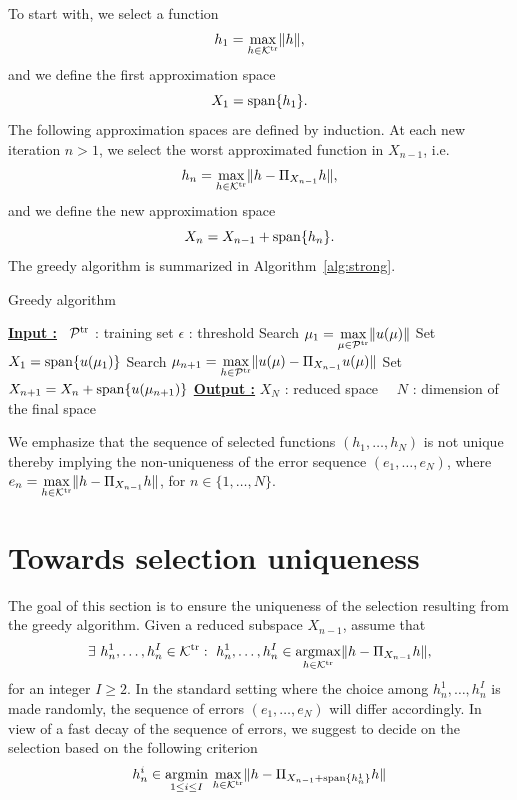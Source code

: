 \documentclass[12pt,a4paper]{article}
\newcommand{\Ptr}{\mathcal P^{\rm tr}}
\newcommand{\calK}{\mathcal K}
\newcommand{\Ktr}{\calK^{\rm tr}}
\begin{document}
To start with, we select a function 
\begin{equation}
h_1 = \underset{h\in\Ktr}{\rm max}\|h\|,
\end{equation}
and we define the first approximation space
\begin{equation}
X_1 = {\rm span}\{h_1\}.
\end{equation}
The following approximation spaces are defined by induction. 
At each new iteration $n>1$, we select the worst approximated function in $X_{n-1}$, i.e.
\begin{equation}
h_n = \underset{h\in\Ktr}{\rm max}\|h-\Pi_{X_{n-1}}h\|,
\end{equation}
and we define the new approximation space
\begin{equation}
X_n = X_{n-1} + {\rm span}\{h_n\}.
\end{equation}
The greedy algorithm is summarized in Algorithm~\ref{alg:strong}.

\begin{algorithm}[H]
\caption{Greedy algorithm}\label{alg:strong}
\begin{algorithmic}[1]
\Statex \textbf{\underline{Input :}}
\ $\Ptr$ : training set
\Statex\qquad\qquad $\epsilon$ : threshold
\State Search $\mu_1 = \underset{\mu\in\Ptr}{\rm max}\|u(\mu)\|$
\State Set $X_1 = {\rm span}\{u(\mu_1)\}$
\While{ $>\epsilon$}
\State Search $\mu_{n+1} = \underset{h\in\Ptr}{\rm max}\|u(\mu)-\Pi_{X_{n-1}}u(\mu)\|$
\State Set $X_{n+1} = X_n+ {\rm span}\{u(\mu_{n+1})\}$
\EndWhile
\Statex \textbf{\underline {Output :}}
$ X_N$ : reduced space
\Statex \qquad\qquad\ \ ${N}$ : dimension of the final space
\vspace{0.2cm}
\end{algorithmic}
\end{algorithm}
We emphasize that the sequence of selected functions $(h_1,\ldots,h_N)$ is not unique thereby implying the non-uniqueness of the error sequence $(e_1,\ldots,e_N)$, where $e_n = \underset{h\in\Ktr}{\rm max}\|h-\Pi_{X_{n-1}}h\|$, for $n\in\{1,\ldots,N\}$.

\section{Towards selection uniqueness}
The goal of this section is to ensure the uniqueness of the selection resulting from the greedy algorithm. 
Given a reduced subspace $X_{n-1}$, assume that
\begin{equation}
\exists\ h_n^1, \ldots, h_n^I\in\Ktr: \ 
h_n^1, \ldots, h_n^I\in \underset{h\in\Ktr}{\rm argmax}\|h-\Pi_{X_{n-1}}h\|,
\end{equation}
for an integer $I\geq 2$.
In the standard setting where the choice among $h_n^1,\ldots,h_n^I$ is made randomly, the sequence of errors $(e_1,\ldots,e_N)$ will differ accordingly. In view of a fast decay of the sequence of errors, we suggest to decide on the selection based on the following criterion
\begin{equation}
h_n^i\in\underset{1\leq i\leq I}{\rm argmin}\ \underset{h\in\Ktr}{\rm max}\|h-\Pi_{X_{n-1}+{\rm span}\{h_n^1\}}h\|
\end{equation}
\end{document}
